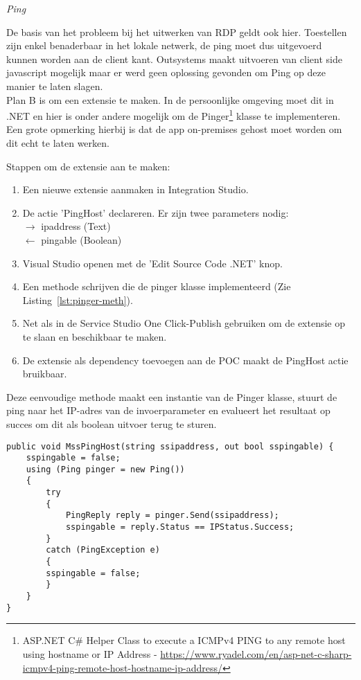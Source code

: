 \textit{Ping}

De basis van het probleem bij het uitwerken van RDP geldt ook hier. Toestellen zijn enkel benaderbaar in het lokale netwerk, de ping moet dus uitgevoerd kunnen worden aan de client kant. Outsystems maakt uitvoeren van client side javascript mogelijk maar er werd geen oplossing gevonden om Ping op deze manier te laten slagen.\\
Plan B is om een extensie te maken. In de persoonlijke omgeving moet dit in .NET en hier is onder andere mogelijk om de Pinger\footnote{ASP.NET C\# Helper Class to execute a ICMPv4 PING to any remote host using hostname or IP Address - \url{https://www.ryadel.com/en/asp-net-c-sharp-icmpv4-ping-remote-host-hostname-ip-address/}} klasse te implementeren. Een grote opmerking hierbij is dat de app on-premises gehost moet worden om dit echt te laten werken.

Stappen om de extensie aan te maken:
\begin{enumerate}
    \item Een nieuwe extensie aanmaken in Integration Studio.
    \item De actie 'PingHost' declareren. Er zijn twee parameters nodig:\\
    $\rightarrow$ ipaddress (Text)\\
    $\leftarrow$ pingable (Boolean)
    \item Visual Studio openen met de 'Edit Source Code .NET' knop.
    \item Een methode schrijven die de pinger klasse implementeerd (Zie Listing~\ref{lst:pinger-meth}). 
    \item Net als in de Service Studio One Click-Publish gebruiken om de extensie op te slaan en beschikbaar te maken.
    \item De extensie als dependency toevoegen aan de POC maakt de PingHost actie bruikbaar.
\end{enumerate}

Deze eenvoudige methode maakt een instantie van de Pinger klasse, stuurt de ping naar het IP-adres van de invoerparameter en evalueert het resultaat op succes om dit als boolean uitvoer terug te sturen. 
\begin{lstlisting}[style=CSharpStyle,label={lst:pinger-meth},caption={Pinger implementatie},captionpos=b]
public void MssPingHost(string ssipaddress, out bool sspingable) {
    sspingable = false;
    using (Ping pinger = new Ping())
    {
        try
        {
            PingReply reply = pinger.Send(ssipaddress);
            sspingable = reply.Status == IPStatus.Success;
        }
        catch (PingException e)
        {
        sspingable = false;
        }
    }
}
\end{lstlisting}

